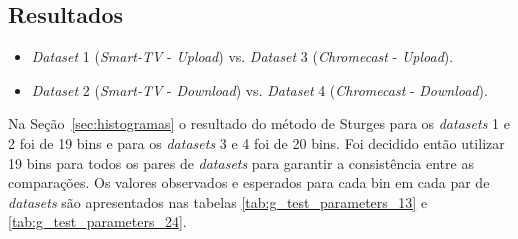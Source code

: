 \subsection{Resultados}

\begin{itemize}
    \item \textit{Dataset} 1 (\textit{Smart-TV} - \textit{Upload}) vs. \textit{Dataset} 3 (\textit{Chromecast} - \textit{Upload}).
    \item \textit{Dataset} 2 (\textit{Smart-TV} - \textit{Download}) vs. \textit{Dataset} 4 (\textit{Chromecast} - \textit{Download}).
\end{itemize}

Na Seção~\ref{sec:histogramas} o resultado do método de Sturges para os \textit{datasets} 1 e 2 foi de 19 bins e para os \textit{datasets} 3 e 4 foi de 20 bins. Foi decidido então utilizar 19 bins para todos os pares de \textit{datasets} para garantir a consistência entre as comparações. Os valores observados e esperados para cada bin em cada par de \textit{datasets} são apresentados nas tabelas \ref{tab:g_test_parameters_13} e \ref{tab:g_test_parameters_24}.

